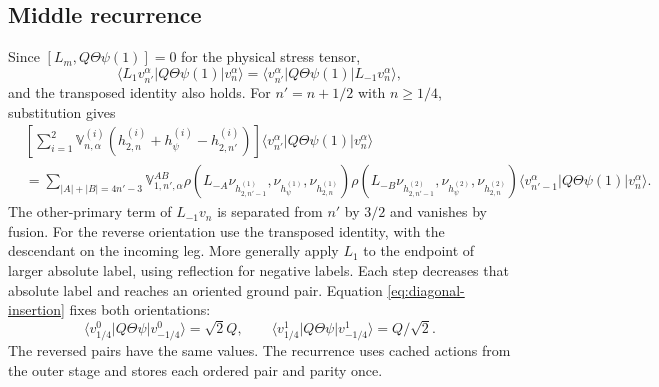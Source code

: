 \documentclass[11pt]{article}
\numberwithin{equation}{section}
\begin{document}
\subsection{Middle recurrence}
Since $[L_m,Q\Theta\psi(1)]=0$ for the physical stress tensor,
\begin{equation}
 \langle L_1v_{n'}^\alpha|Q\Theta\psi(1)|v_n^\alpha\rangle
 =\langle v_{n'}^\alpha|Q\Theta\psi(1)|L_{-1}v_n^\alpha\rangle,
 \label{eq:middle-ward}
\end{equation}
and the transposed identity also holds. For $n'=n+1/2$ with $n\ge1/4$,
substitution gives
\begin{align}
 &\left[\sum_{i=1}^2\mathbb V_{n,\alpha}^{(i)}
 (h_{2,n}^{(i)}+h_\psi^{(i)}-h_{2,n'}^{(i)})\right]
 \langle v_{n'}^\alpha|Q\Theta\psi(1)|v_n^\alpha\rangle\nonumber\\
 &=\sum_{|A|+|B|=4n'-3}\mathbb V_{1,n',\alpha}^{AB}
 \rho(L_{-A}\nu_{h_{2,n'-1}^{(1)}},\nu_{h_\psi^{(1)}},\nu_{h_{2,n}^{(1)}})
 \rho(L_{-B}\nu_{h_{2,n'-1}^{(2)}},\nu_{h_\psi^{(2)}},\nu_{h_{2,n}^{(2)}})
 \langle v_{n'-1}^\alpha|Q\Theta\psi(1)|v_n^\alpha\rangle.
 \label{eq:middle-recursion}
\end{align}
The other-primary term of $L_{-1}v_n$ is separated from $n'$ by $3/2$
and vanishes by fusion. For the reverse orientation use the transposed
identity, with the descendant on the incoming leg. More generally apply
$L_1$ to the endpoint of larger absolute label, using reflection for negative
labels. Each step decreases that absolute label and reaches an oriented
ground pair. Equation \eqref{eq:diagonal-insertion} fixes both orientations:
\begin{equation}
 \langle v_{1/4}^0|Q\Theta\psi|v_{-1/4}^0\rangle=\sqrt2Q,
 \qquad
 \langle v_{1/4}^1|Q\Theta\psi|v_{-1/4}^1\rangle=Q/\sqrt2.
\end{equation}
The reversed pairs have the same values. The recurrence uses cached actions
from the outer stage and stores each ordered pair and parity once.
\end{document}
